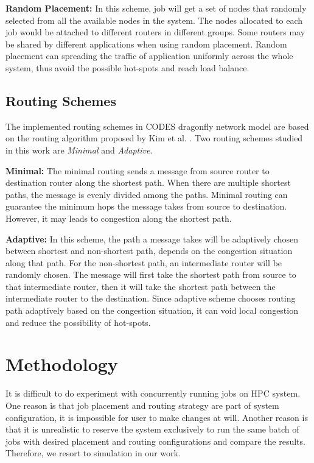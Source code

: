 \documentclass[conference,compsoc]{IEEEtran}
\begin{document}
\textbf{Random Placement:} In this scheme, job will get a set of nodes that randomly selected from all the available nodes in the system. The nodes allocated to each job would be attached to different routers in different groups. Some routers may be shared by different applications when using random placement. Random placement can spreading the traffic of application uniformly across the whole system, thus avoid the possible hot-spots and reach load balance.


\subsection{Routing Schemes}
\label{sec:routing}

The implemented routing schemes in CODES dragonfly network model are based on the routing algorithm proposed by Kim et al. \cite{dally-dragonfly}. Two routing schemes studied in this work are \emph{Minimal} and \emph{Adaptive}.

\textbf{Minimal:} The minimal routing sends a message from source router to destination router along the shortest path. When there are multiple shortest paths, the message is evenly divided among the paths. Minimal routing can guarantee the minimum hops the message takes from source to destination. However, it may leads to congestion along the shortest path. 


\textbf{Adaptive:} In this scheme, the path a message takes will be adaptively chosen between shortest and non-shortest path, depends on the congestion situation along that path. For the non-shortest path, an intermediate router will be randomly chosen. The message will first take the shortest path from source to that intermediate router, then it will take the shortest path between the intermediate router to the destination. Since adaptive scheme chooses routing path adaptively based on the congestion situation, it can void local congestion and reduce the possibility of hot-spots. 

\section{Methodology}
\label{sec: methodology}

It is difficult to do experiment with concurrently running jobs on HPC system. One reason is that job placement and routing strategy are part of system configuration, it is impossible for user to make changes at will. Another reason is that it is unrealistic to reserve the system exclusively to run the same batch of jobs with desired placement and routing configurations and compare the results. Therefore, we resort to simulation in our work.
\end{document}
